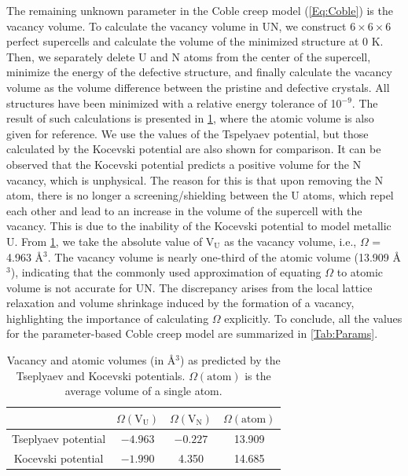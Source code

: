 \documentclass[preprint,12pt,sort&compress]{elsarticle}
\newcommand{\?}{\stackrel{?}{=}}
\begin{document}
The remaining unknown parameter in the Coble creep model (\cref{Eq:Coble}) is the vacancy volume. To calculate the vacancy volume in UN, we construct $6 \times 6 \times 6$ perfect supercells and calculate the volume of the minimized structure at 0 K. Then, we separately delete U and N atoms from the center of the supercell, minimize the energy of the defective structure, and finally calculate the vacancy volume as the volume difference between the pristine and defective crystals. All structures have been minimized with a relative energy tolerance of 10$^{-9}$. The result of such calculations is presented in \cref{Tab:VacancyVolume}, where the atomic volume is also given for reference. We use the values of the Tspelyaev potential, but those calculated by the Kocevski potential are also shown for comparison. It can be observed that the Kocevski potential predicts a positive volume for the N vacancy, which is unphysical. The reason for this is that upon removing the N atom, there is no longer a screening/shielding between the U atoms, which repel each other and lead to an increase in the volume of the supercell with the vacancy. This is due to the inability of the Kocevski potential to model metallic U. From \cref{Tab:VacancyVolume}, we take the absolute value of $\text{V}_\text{U}$ as the vacancy volume, i.e., $\Omega$ = 4.963 \AA$^3$. The vacancy volume is nearly one-third of the atomic volume (13.909 {\AA$^3$}), indicating that the commonly used approximation of equating $\Omega$ to atomic volume \cite{Courtney2005} is not accurate for UN. The discrepancy arises from the local lattice relaxation and volume shrinkage induced by the formation of a vacancy, highlighting the importance of calculating $\Omega$ explicitly.
To conclude, all the values for the parameter-based Coble creep model are summarized in \cref{Tab:Params}.

\begin{table}[h!]
\centering
\caption{Vacancy and atomic volumes (in \AA$^3$) as predicted by the Tseplyaev and Kocevski potentials. $\Omega(\mathrm{atom})$ is the average volume of a single atom.}
\footnotesize
\begin{tabular}{cccc}
\hline
                    & $\Omega(\mathrm{V}_\mathrm{U})$ & $\Omega(\mathrm{V}_\mathrm{N})$  & $\Omega(\mathrm{atom})$ \\
\hline
Tseplyaev potential & $-4.963$      & $-0.227$       & 13.909 \\
Kocevski potential  & $-1.990$      & 4.350          & 14.685 \\
\hline
\end{tabular}
\label{Tab:VacancyVolume}
\end{table}
\end{document}
